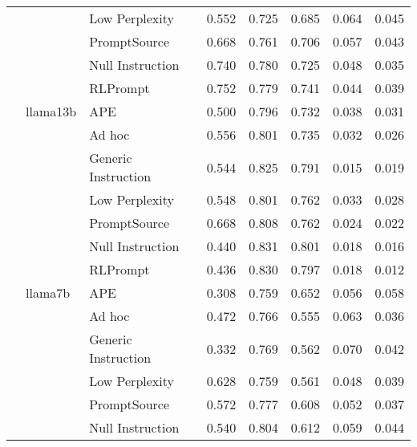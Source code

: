 \begin{supertabular}{lllrrrrr}
              &        & Low Perplexity &            0.552 &           0.725 &          0.685 &        0.064 &    0.045 \\
              &        & PromptSource &            0.668 &           0.761 &          0.706 &        0.057 &    0.043 \\
              &        & Null Instruction &            0.740 &           0.780 &          0.725 &        0.048 &    0.035 \\
              &        & RLPrompt &            0.752 &           0.779 &          0.741 &        0.044 &    0.039 \\
              & llama13b & APE &            0.500 &           0.796 &          0.732 &        0.038 &    0.031 \\
              &        & Ad hoc &            0.556 &           0.801 &          0.735 &        0.032 &    0.026 \\
              &        & Generic Instruction &            0.544 &           0.825 &          0.791 &        0.015 &    0.019 \\
              &        & Low Perplexity &            0.548 &           0.801 &          0.762 &        0.033 &    0.028 \\
              &        & PromptSource &            0.668 &           0.808 &          0.762 &        0.024 &    0.022 \\
              &        & Null Instruction &            0.440 &           0.831 &          0.801 &        0.018 &    0.016 \\
              &        & RLPrompt &            0.436 &           0.830 &          0.797 &        0.018 &    0.012 \\
              & llama7b & APE &            0.308 &           0.759 &          0.652 &        0.056 &    0.058 \\
              &        & Ad hoc &            0.472 &           0.766 &          0.555 &        0.063 &    0.036 \\
              &        & Generic Instruction &            0.332 &           0.769 &          0.562 &        0.070 &    0.042 \\
              &        & Low Perplexity &            0.628 &           0.759 &          0.561 &        0.048 &    0.039 \\
              &        & PromptSource &            0.572 &           0.777 &          0.608 &        0.052 &    0.037 \\
              &        & Null Instruction &            0.540 &           0.804 &          0.612 &        0.059 &    0.044 \\

\end{supertabular}
